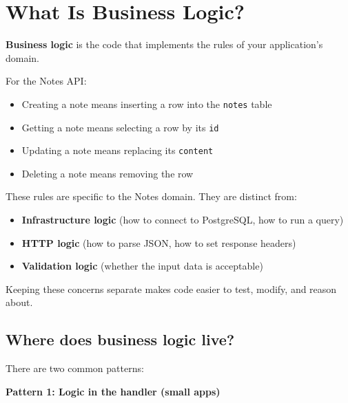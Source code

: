\setcounter{section}{0}
\section{What Is Business Logic?}\label{33-logic-execution:331-what-is-business-logic}

\textbf{Business logic} is the code that implements the rules of your application's domain.

For the Notes API:

\begin{itemize}
\tightlist
\item
  Creating a note means inserting a row into the \texttt{notes} table
\item
  Getting a note means selecting a row by its \texttt{id}
\item
  Updating a note means replacing its \texttt{content}
\item
  Deleting a note means removing the row
\end{itemize}

\noindent{}These rules are specific to the Notes domain. They are distinct from:

\begin{itemize}
\tightlist
\item
  \textbf{Infrastructure logic} (how to connect to PostgreSQL, how to run a query)
\item
  \textbf{HTTP logic} (how to parse JSON, how to set response headers)
\item
  \textbf{Validation logic} (whether the input data is acceptable)
\end{itemize}

\noindent{}Keeping these concerns separate makes code easier to test, modify, and reason about.

\subsection*{Where does business logic live?}\label{33-logic-execution:where-does-business-logic-live}

There are two common patterns:

\textbf{Pattern 1: Logic in the handler (small apps)}

